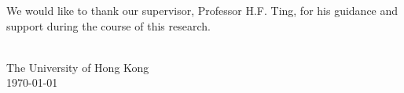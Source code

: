 \begin{acknowledgements}
\setcounter{page}{2}
\addchaptertocentry{\acknowledgementname} %
\vspace{1cm}


\noindent We would like to thank our supervisor, Professor H.F. Ting, for his guidance and support during the course of this research.
\\[0.4cm]

\begin{flushright}
    \authorname \\
    The University of Hong Kong \\
    \usdate\today
\end{flushright}

\end{acknowledgements}